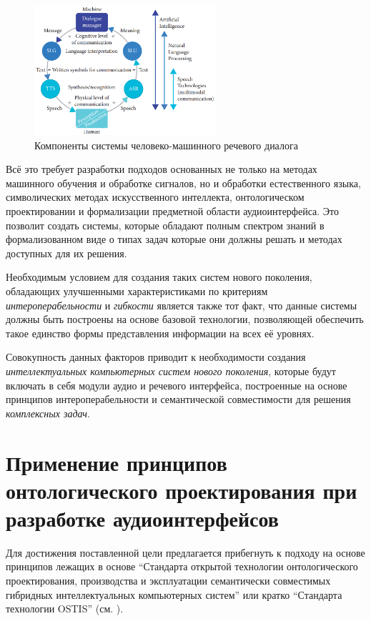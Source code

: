 \begin{figure}[H]
    \centerline{
        \includegraphics[scale=0.6, width=0.6\textwidth]{author/part4/figures/ch43_fig01_speech-hmi-components.png}
    }
    \caption{Компоненты системы человеко-машинного речевого диалога \cite{Delic2019speech}}
    \label{fig:speech-hmi-components}
\end{figure}

Всё это требует разработки подходов основанных не только на методах машинного обучения и обработке сигналов, но и обработки естественного языка, символических методах искусственного интеллекта, онтологическом проектировании и формализации предметной области аудиоинтерфейса. Это позволит создать системы, которые обладают полным спектром знаний в формализованном виде о типах задач которые они должны решать и методах доступных для их решения.

Необходимым условием для создания таких систем нового поколения, обладающих улучшенными характеристиками по критериям \textit{интероперабельности} и \textit{гибкости} является также тот факт, что данные системы должны быть построены на основе базовой технологии, позволяющей обеспечить такое единство формы представления информации на всех её уровнях.
 
Совокупность данных факторов приводит к необходимости создания \textit{интеллектуальных компьютерных систем нового поколения}, которые будут включать в себя модули аудио и речевого интерфейса, построенные на основе принципов интероперабельности и семантической совместимости для решения \textit{комплексных задач}.


\section{Применение принципов онтологического проектирования при разработке аудиоинтерфейсов}
\label{sec_audio_interfaces_review}

Для достижения поставленной цели предлагается прибегнуть к подходу на основе принципов лежащих в основе ``Стандарта открытой технологии онтологического проектирования, производства и эксплуатации семантически совместимых гибридных интеллектуальных компьютерных систем'' или кратко ``Стандарта технологии OSTIS'' (см. ).

